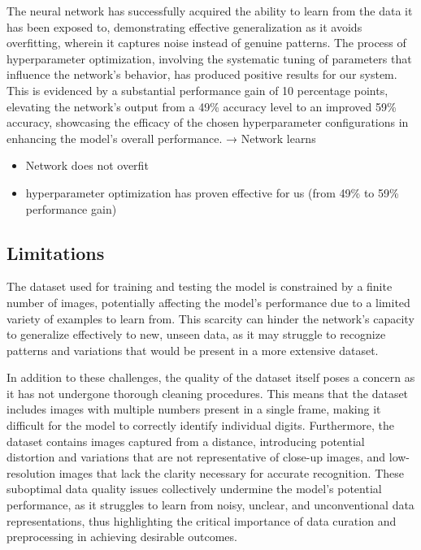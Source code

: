 \documentclass[12pt,a4paper]{article}
\begin{document}
The neural network has successfully acquired the ability to learn from the data it has been exposed to, demonstrating effective generalization as it avoids overfitting, wherein it captures noise instead of genuine patterns. The process of hyperparameter optimization, involving the systematic tuning of parameters that influence the network's behavior, has produced positive results for our system. This is evidenced by a substantial performance gain of 10 percentage points, elevating the network's output from a 49\% accuracy level to an improved 59\% accuracy, showcasing the efficacy of the chosen hyperparameter configurations in enhancing the model's overall performance.
\linebreak
 \newline → Network learns
\begin{itemize}
    \item Network does not overfit
    \item hyperparameter optimization has proven effective for us
(from 49\% to 59\% performance gain)
\end{itemize}


\subsection{Limitations}
The dataset used for training and testing the model is constrained by a finite number of images, potentially affecting the model's performance due to a limited variety of examples to learn from. This scarcity can hinder the network's capacity to generalize effectively to new, unseen data, as it may struggle to recognize patterns and variations that would be present in a more extensive dataset.

In addition to these challenges, the quality of the dataset itself poses a concern as it has not undergone thorough cleaning procedures. This means that the dataset includes images with multiple numbers present in a single frame, making it difficult for the model to correctly identify individual digits. Furthermore, the dataset contains images captured from a distance, introducing potential distortion and variations that are not representative of close-up images, and low-resolution images that lack the clarity necessary for accurate recognition. These suboptimal data quality issues collectively undermine the model's potential performance, as it struggles to learn from noisy, unclear, and unconventional data representations, thus highlighting the critical importance of data curation and preprocessing in achieving desirable outcomes.
\end{document}
